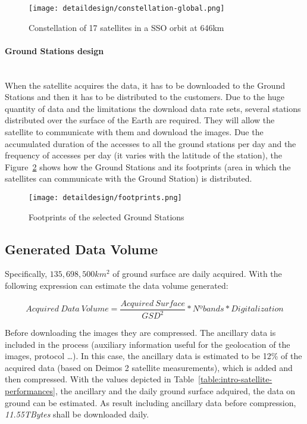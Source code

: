 \begin{figure}[!h]
\begin{center}
\texttt{[image: detaildesign/constellation-global.png]}
\caption{Constellation of 17 satellites in a SSO orbit at 646km}
\label{fig:intr-constellation-global}
\end{center}
\end{figure}

\paragraph{Ground Stations design}~\\
When the satellite acquires the data, it has to be downloaded to the Ground
Stations and then it has to be distributed to the customers. Due to the huge
quantity of data and the limitations the download data rate sets, several
stations distributed over the surface of the Earth are required. They will allow
the satellite to communicate with them and download the images. Due the
accumulated duration of the accesses to all the ground stations per day and the
frequency of accesses per day (it varies with the latitude of the station), the
Figure~\ref{fig:intr-footprints} shows how the Ground Stations and its
footprints (area in which the satellites can communicate with the Ground
Station) is distributed.


\begin{figure}[!h]
\begin{center}
\texttt{[image: detaildesign/footprints.png]}
\caption{Footprints of the selected Ground Stations}
\label{fig:intr-footprints}
\end{center}
\end{figure}

\subsection{Generated Data Volume}

Specifically, $135,698,500 km^2$ of ground surface are daily acquired. With the following expression can estimate the data volume generated:

\begin{equation}
Acquired~Data~Volume= \frac{Acquired~Surface}{GSD^2} * Nº bands * Digitalization
\end{equation}

Before downloading the images they are compressed. The ancillary data is
included in the process (auxiliary information useful for the geolocation of the
images, protocol \ldots). In this case, the ancillary data is estimated to be
12\% of the acquired data (based on Deimos 2 satellite measurements), which is
added and then compressed. With the values depicted in
Table~\ref{table:intro-satellite-performances}, the ancillary and the daily ground
surface adquired, the data on ground can be estimated. As result including ancillary data before compression, \emph{11.55TBytes} shall be downloaded daily.

